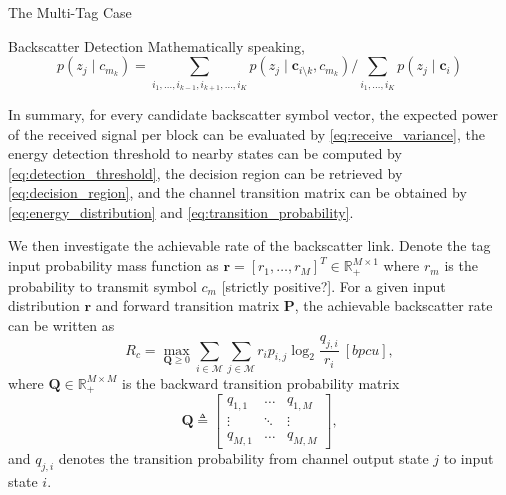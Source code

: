 \documentclass[journal]{IEEEtran}
\begin{document}
\begin{section}{The Multi-Tag Case}
\begin{subsection}{Backscatter Detection}
			Mathematically speaking,
			\begin{equation}
				p(z_j \mid c_{m_k}) = \sum_{i_1,\ldots,i_{k-1},i_{k+1},\ldots,i_K} p(z_j \mid \boldsymbol{c}_{i \setminus k}, c_{m_k}) / \sum_{i_1,\ldots,i_K} p(z_j \mid \boldsymbol{c}_i)
			\end{equation}

			In summary, for every candidate backscatter symbol vector, the expected power of the received signal per block can be evaluated by \eqref{eq:receive_variance}, the energy detection threshold to nearby states can be computed by \eqref{eq:detection_threshold}, the decision region can be retrieved by \eqref{eq:decision_region}, and the channel transition matrix can be obtained by \eqref{eq:energy_distribution} and \eqref{eq:transition_probability}.

			We then investigate the achievable rate of the backscatter link. Denote the tag input probability mass function as $\boldsymbol{r} = [r_1,\ldots,r_M]^T \in \mathbb{R}_+^{M \times 1}$ where $r_m$ is the probability to transmit symbol $c_m$ [strictly positive?]. For a given input distribution $\boldsymbol{r}$ and forward transition matrix $\boldsymbol{P}$, the achievable backscatter rate can be written as
			\begin{equation}
				R_c = \max_{\boldsymbol{Q} \ge 0} \sum_{i \in \mathcal{M}} \sum_{j \in \mathcal{M}} r_i p_{i,j} \log_2 \frac{q_{j, i}}{r_i} \ [\si{bpcu}],
				\label{eq:secondary_rate}
			\end{equation}
			where $\boldsymbol{Q} \in \mathbb{R}_{+}^{M \times M}$ is the backward transition probability matrix
			\begin{equation}
				\boldsymbol{Q} \triangleq
				\begin{bmatrix}
					q_{1, 1} & \ldots & q_{1, M} \\
					\vdots & \ddots & \vdots \\
					q_{M, 1} & \ldots & q_{M, M}
				\end{bmatrix},
			\end{equation}
			and $q_{j, i}$ denotes the transition probability from channel output state $j$ to input state $i$.
		\end{subsection}
	\end{section}
\end{document}
